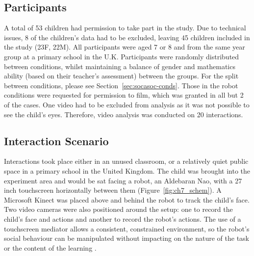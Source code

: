 \subsection{Participants}\label{sec:socasoc-participants}
A total of 53 children had permission to take part in the study. Due to technical issues, 8 of the children's data had to be excluded, leaving 45 children included in the study (23F, 22M). All participants were aged 7 or 8 and from the same year group at a primary school in the U.K. Participants were randomly distributed between conditions, whilst maintaining a balance of gender and mathematics ability (based on their teacher's assessment) between the groups. For the split between conditions, please see Section~\ref{sec:socasoc-conds}. Those in the robot conditions were requested for permission to film, which was granted in all but 2 of the cases. One video had to be excluded from analysis as it was not possible to see the child's eyes. Therefore, video analysis was conducted on 20 interactions.

\subsection{Interaction Scenario}\label{sec:socasoc-scenario}
Interactions took place either in an unused classroom, or a relatively quiet public space in a primary school in the United Kingdom. The child was brought into the experiment area and would be sat facing a robot, an Aldebaran Nao, with a 27 inch touchscreen horizontally between them (Figure~\ref{fig:ch7_schem}). A Microsoft Kinect was placed above and behind the robot to track the child's face. Two video cameras were also positioned around the setup: one to record the child's face and actions and another to record the robot's actions. The use of a touchscreen mediator \citep{baxter2012touchscreen} allows a consistent, constrained environment, so the robot's social behaviour can be manipulated without impacting on the nature of the task or the content of the \gls{learning} \citep{kennedy2013constraining}.

